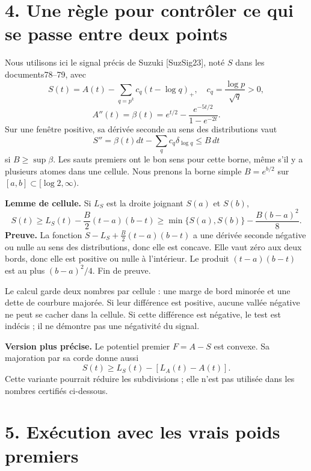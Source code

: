 \documentclass[
  11pt,
]{article}
\begin{document}
\hypertarget{une-ruxe8gle-pour-contruxf4ler-ce-qui-se-passe-entre-deux-points}{%
\section{4. Une règle pour contrôler ce qui se passe entre deux
points}\label{une-ruxe8gle-pour-contruxf4ler-ce-qui-se-passe-entre-deux-points}}

Nous utilisons ici le signal précis de Suzuki {[}SuzSig23{]}, noté \(S\)
dans les documents78--79, avec \[
S(t)=A(t)-\sum_{q=p^k}c_q(t-\log q)_+,
\quad c_q=\frac{\log p}{\sqrt q}>0,
\] \[
A''(t)=\beta(t)=e^{t/2}-\frac{e^{-5t/2}}{1-e^{-2t}}.
\] Sur une fenêtre positive, sa dérivée seconde au sens des
distributions vaut \[
S''=\beta(t)dt-\sum_qc_q\delta_{\log q}\le B\,dt
\] si \(B\ge\sup\beta\). Les sauts premiers ont le bon sens pour cette
borne, même s'il y a plusieurs atomes dans une cellule. Nous prenons la
borne simple \(B=e^{b/2}\) sur \([a,b]\subset[\log2,\infty)\).

\textbf{Lemme de cellule.} Si \(L_S\) est la droite joignant \(S(a)\) et
\(S(b)\), \[
\boxed{S(t)\ge L_S(t)-\frac B2(t-a)(b-t)
\ge\min\{S(a),S(b)\}-\frac{B(b-a)^2}{8}.}
\] \textbf{Preuve.} La fonction \(S-L_S+\frac B2(t-a)(b-t)\) a une
dérivée seconde négative ou nulle au sens des distributions, donc elle
est concave. Elle vaut zéro aux deux bords, donc elle est positive ou
nulle à l'intérieur. Le produit \((t-a)(b-t)\) est au plus
\((b-a)^2/4\). Fin de preuve.

Le calcul garde deux nombres par cellule : une marge de bord minorée et
une dette de courbure majorée. Si leur différence est positive, aucune
vallée négative ne peut se cacher dans la cellule. Si cette différence
est négative, le test est indécis ; il ne démontre pas une négativité du
signal.

\textbf{Version plus précise.} Le potentiel premier \(F=A-S\) est
convexe. Sa majoration par sa corde donne aussi \[
S(t)\ge L_S(t)-[L_A(t)-A(t)].
\] Cette variante pourrait réduire les subdivisions ; elle n'est pas
utilisée dans les nombres certifiés ci-dessous.

\newpage

\hypertarget{exuxe9cution-avec-les-vrais-poids-premiers}{%
\section{5. Exécution avec les vrais poids
premiers}\label{exuxe9cution-avec-les-vrais-poids-premiers}}
\end{document}
